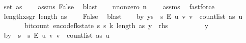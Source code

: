 \begin{isabellebody}
\ {\isachardoublequoteopen}set\ as\ {\isasymnoteq}\ {\isacharbraceleft}{\kern0pt}{\isacharbraceright}{\kern0pt}{\isachardoublequoteclose}\ \isamarkupfalse%
\ assms\ False\ \isamarkupfalse%
\ blast\isanewline
\ \ \isamarkupfalse%
\ n{\isacharunderscore}{\kern0pt}nonzero{\isacharcolon}{\kern0pt}\ {\isachardoublequoteopen}n\ {\isachargreater}{\kern0pt}\ {}{\isachardoublequoteclose}\ \isamarkupfalse%
\ assms{\isacharparenleft}{\kern0pt}{}{\isacharparenright}{\kern0pt}\ \isamarkupfalse%
\ fastforce\isanewline
\ \ \isamarkupfalse%
\ length{\isacharunderscore}{\kern0pt}xs{\isacharunderscore}{\kern0pt}gr{\isacharunderscore}{\kern0pt}{}{\isacharcolon}{\kern0pt}\ {\isachardoublequoteopen}length\ as\ {\isachargreater}{\kern0pt}\ {}{\isachardoublequoteclose}\ \isamarkupfalse%
\ False\ \isamarkupfalse%
\ blast\isanewline
\isanewline
\ \ \isamarkupfalse%
\ b{\isacharcolon}{\kern0pt}{\isachardoublequoteopen}{\isasymAnd}y{\isachardot}{\kern0pt}\ y{\isasymin}{\isacharbraceleft}{\kern0pt}{}{\isachardot}{\kern0pt}{\isachardot}{\kern0pt}{\isacharless}{\kern0pt}s\ {\isasymtimes}\ {\isacharbraceleft}{\kern0pt}{}{\isachardot}{\kern0pt}{\isachardot}{\kern0pt}{\isacharless}{\kern0pt}s\ {\isasymrightarrow}\isactrlsub E\ {\isacharbraceleft}{\kern0pt}{\isacharparenleft}{\kern0pt}u{\isacharcomma}{\kern0pt}\ v{\isacharparenright}{\kern0pt}{\isachardot}{\kern0pt}\ v\ {\isacharless}{\kern0pt}\ count{\isacharunderscore}{\kern0pt}list\ as\ u{\isacharbraceright}{\kern0pt}\ {\isasymLongrightarrow}\isanewline
\ \ \ \ \ \ \ bit{\isacharunderscore}{\kern0pt}count\ {\isacharparenleft}{\kern0pt}encode{\isacharunderscore}{\kern0pt}fk{\isacharunderscore}{\kern0pt}state\ {\isacharparenleft}{\kern0pt}s\ s\ k{\isacharcomma}{\kern0pt}\ length\ as{\isacharcomma}{\kern0pt}\ y{\isacharparenright}{\kern0pt}{\isacharparenright}{\kern0pt}\ {\isasymle}\ {\isacharquery}{\kern0pt}rhs{\isachardoublequoteclose}\isanewline
\ \ \isamarkupfalse%
\ {\isacharminus}{\kern0pt}\isanewline
\ \ \ \ \isamarkupfalse%
\ y\isanewline
\ \ \ \ \isamarkupfalse%
\ b{}{\isacharcolon}{\kern0pt}{\isachardoublequoteopen}y\ {\isasymin}\ {\isacharbraceleft}{\kern0pt}{}{\isachardot}{\kern0pt}{\isachardot}{\kern0pt}{\isacharless}{\kern0pt}s\ {\isasymtimes}\ {\isacharbraceleft}{\kern0pt}{}{\isachardot}{\kern0pt}{\isachardot}{\kern0pt}{\isacharless}{\kern0pt}s\ {\isasymrightarrow}\isactrlsub E\ {\isacharbraceleft}{\kern0pt}{\isacharparenleft}{\kern0pt}u{\isacharcomma}{\kern0pt}\ v{\isacharparenright}{\kern0pt}{\isachardot}{\kern0pt}\ v\ {\isacharless}{\kern0pt}\ count{\isacharunderscore}{\kern0pt}list\ as\ u{\isacharbraceright}{\kern0pt}{\isachardoublequoteclose}\isanewline

\end{isabellebody}
